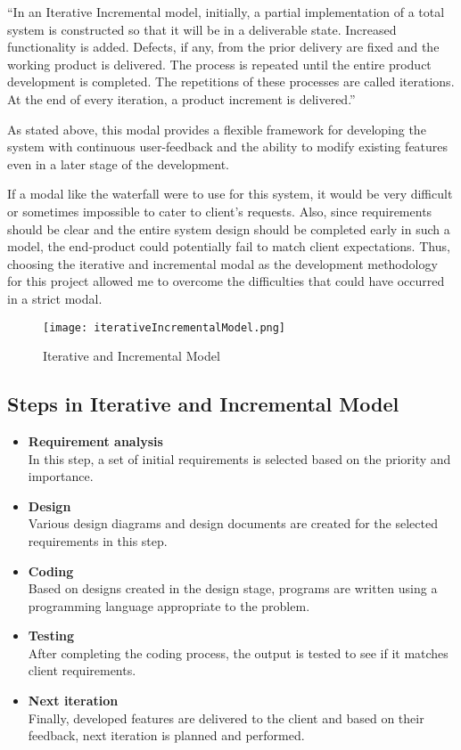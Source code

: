 \documentclass[12pt]{report}
\begin{document}
``In an Iterative Incremental model, initially, a partial implementation of a total system is constructed so that it will be in a deliverable state. Increased functionality is added. Defects, if any, from the prior delivery are fixed and the working product is delivered. The process is repeated until the entire product development is completed. The repetitions of these processes are called iterations. At the end of every iteration, a product increment is delivered.''\cite{tpoint_2019_iterative_incremental}

As stated above, this modal provides a flexible framework for developing the system with continuous user-feedback and the ability to modify existing features even in a later stage of the development.

If a modal like the waterfall were to use for this system, it would be very difficult or sometimes impossible to cater to client's requests. Also, since requirements should be clear and the entire system design should be completed early in such a model, the end-product could potentially fail to match client expectations. Thus, choosing the iterative and incremental modal as the development methodology for this project allowed me to overcome the difficulties that could have occurred in a strict modal.

\begin{figure}[H]
	\centering
	\texttt{[image: iterativeIncrementalModel.png]}
	\caption{Iterative and Incremental Model}
\end{figure}

\subsection{Steps in Iterative and Incremental Model}
\begin{itemize}
	\item {\bf{Requirement analysis}}\\
	      In this step, a set of initial requirements is selected based on the priority and importance.

	\item {\bf{Design}}\\
	      Various design diagrams and design documents are created for the selected requirements in this step.

	\item {\bf{Coding}}\\
	      Based on designs created in the design stage, programs are written using a programming language appropriate to the problem.

	\item {\bf{Testing}}\\
	      After completing the coding process, the output is tested to see if it matches client requirements.

	\item {\bf{Next iteration}}\\
	      Finally, developed features are delivered to the client and based on their feedback, next iteration is planned and performed.

\end{itemize}
\end{document}
